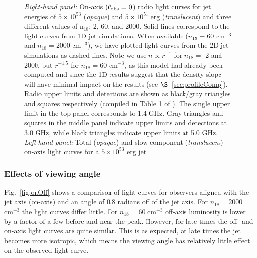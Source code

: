 \documentclass[usenatbib,fleqn]{mnras}
\begin{document}
\begin{figure}
  \caption{\label{fig:lightcurves} \textit{Right-hand panel:} On-axis
    ($\theta_{\rm obs}=0$) radio light curves for jet energies of
    $5\times 10^{53}$ ({\it opaque}) and $5\times 10^{51}$ erg
    ({\it translucent}) and three different values of n$_{18}$: 2, 60,
    and 2000.  Solid lines correspond to the light curves from 1D jet
    simulations. When available ($n_{18}=60$ cm$^{-3}$ and
    $n_{18}=2000$ cm$^{-3}$), we have plotted light curves from the 2D
    jet simulations as dashed lines. Note we use $n\propto r^{-1}$ for
    $n_{18}=$ 2 and 2000, but $r^{-1.5}$ for $n_{18}=60$ cm$^{-3}$, as
    this model had already been computed and since the 1D results
    suggest that the density slope will have minimal impact on the
    results (see $\S$~\ref{sec:profileComp}).  Radio upper limits and
    detections are shown as black/gray triangles and squares
    respectively (compiled in Table 1 of \citealt{Mimica+2015}). The
    single upper limit in the top panel corresponds to 1.4 GHz. Gray
    triangles and squares in the middle panel indicate upper limits
    and detections at 3.0 GHz, while black triangles indicate upper
    limits at 5.0 GHz. \textit{Left-hand panel:} Total ({\it opaque})
    and slow component ({\it translucent}) on-axis light curves for a
    $5\times 10^{53}$ erg jet.}
\end{figure}


 \subsubsection{Effects of viewing angle}
 Fig.~\ref{fig:onOff} shows a comparison of light curves for observers
 aligned with the jet axis (on-axis) and an angle of 0.8 radians off
 of the jet axis.  For $n_{18}=2000$ cm$^{-3}$ the light curves differ
 little.  For $n_{18}=60$ cm$^{-3}$ off-axis luminosity is lower by a
 factor of a few before and near the peak. However, for late times the
 off- and on-axis light curves are quite similar. This is as expected,
 at late times the jet becomes more isotropic, which means the viewing
 angle has relatively little effect on the observed light curve.
\end{document}
